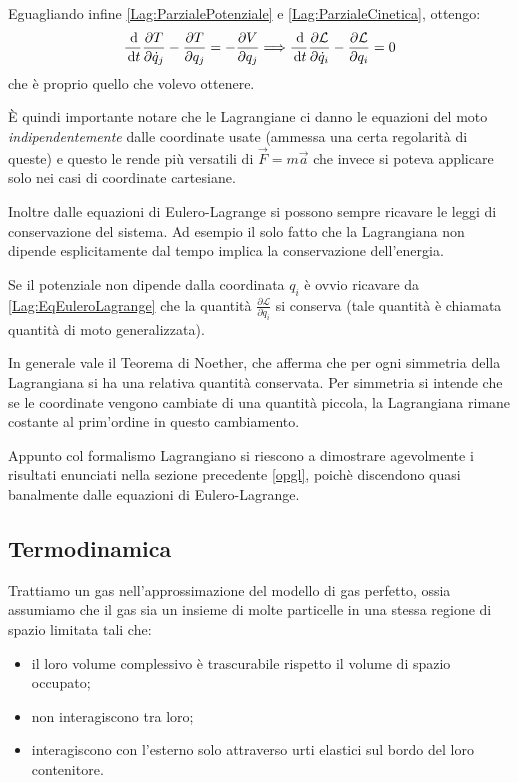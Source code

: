 \documentclass[../main.tex]{subfiles}
\begin{document}
Eguagliando infine \cref{Lag:ParzialePotenziale} e \cref{Lag:ParzialeCinetica}, ottengo:
\begin{equation*}
	\frac{\,\mathrm{d}}{\,\mathrm{d} t}\frac{\partial T}{\partial \dot q_j} - \frac{\partial T}{\partial q_j}=-\frac{\partial V}{\partial q_j} \Longrightarrow \frac{\,\mathrm{d}}{\,\mathrm{d} t} \frac{\partial \mathcal L}{\partial \dot q_i} - \frac{\partial \mathcal L}{\partial q_i}=0
\end{equation*}
che è proprio quello che volevo ottenere.

È quindi importante notare che le Lagrangiane ci danno le equazioni del moto \emph{indipendentemente} dalle coordinate usate (ammessa una certa regolarità di queste) e questo le rende più versatili di $\vec F=m\vec a$ che invece si poteva applicare solo nei casi di coordinate cartesiane.

Inoltre dalle equazioni di Eulero-Lagrange si possono sempre ricavare le leggi di conservazione del sistema. Ad esempio il solo fatto che la Lagrangiana non dipende esplicitamente dal tempo implica la conservazione dell'energia.

Se il potenziale non dipende dalla coordinata $q_i$ è ovvio ricavare da \cref{Lag:EqEuleroLagrange} che la quantità $\frac{\partial \mathcal L}{\partial \dot q_i}$ si conserva (tale quantità è chiamata quantità di moto generalizzata).

In generale vale il Teorema di Noether, che afferma che per ogni simmetria della Lagrangiana si ha una relativa quantità conservata. Per simmetria si intende che se le coordinate vengono cambiate di una quantità piccola, la Lagrangiana rimane costante al prim'ordine in questo cambiamento.

Appunto col formalismo Lagrangiano si riescono a dimostrare agevolmente i risultati enunciati nella sezione precedente \cref{opgl}, poichè discendono quasi banalmente dalle equazioni di Eulero-Lagrange.

\subsection{Termodinamica}\label{formulario:term}

Trattiamo un gas nell'approssimazione del modello di gas perfetto, ossia assumiamo che il gas sia un insieme di molte particelle in una stessa regione
di spazio limitata tali che:
\begin{itemize}
	\item il loro volume complessivo è trascurabile rispetto il volume di spazio occupato;
	\item non interagiscono tra loro;
	\item interagiscono con l'esterno solo attraverso urti elastici sul bordo del loro contenitore.
\end{itemize}
\end{document}
